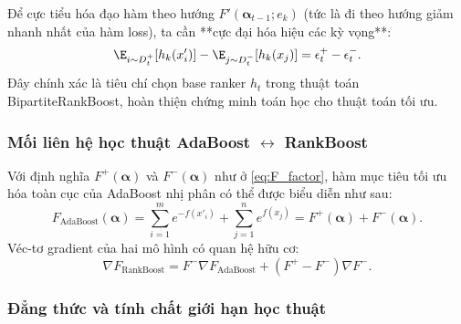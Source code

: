 \begin{extension}
Để cực tiểu hóa đạo hàm theo hướng $F'(\bm{\alpha}_{t-1}; e_k)$ (tức là đi theo hướng giảm nhanh nhất của hàm loss), ta cần **cực đại hóa hiệu các kỳ vọng**:
\[
    \E_{i \sim D^+_t}[h_k(x'_i)] - \E_{j \sim D^-_t}[h_k(x_j)] = \epsilon^+_t - \epsilon^-_t.
\]
Đây chính xác là tiêu chí chọn base ranker $h_t$ trong thuật toán BipartiteRankBoost, hoàn thiện chứng minh toán học cho thuật toán tối ưu.
\end{extension}

\subsubsection{Mối liên hệ học thuật AdaBoost $\leftrightarrow$ RankBoost}

Với định nghĩa $F^+(\bm{\alpha})$ và $F^-(\bm{\alpha})$ như ở \eqref{eq:F_factor}, hàm mục tiêu tối ưu hóa toàn cục của AdaBoost nhị phân có thể được biểu diễn như sau:
\begin{equation}
    F_{\text{AdaBoost}}(\bm{\alpha}) = \sum_{i=1}^m e^{-f(x'_i)} + \sum_{j=1}^n e^{f(x_j)} = F^+(\bm{\alpha}) + F^-(\bm{\alpha}).
\end{equation}
Véc-tơ gradient của hai mô hình có quan hệ hữu cơ:
\begin{equation}
    \nabla F_{\text{RankBoost}} = F^- \nabla F_{\text{AdaBoost}} + (F^+ - F^-)\nabla F^-.
    \label{eq:grad_relation}
\end{equation}

\subsubsection*{Đẳng thức và tính chất giới hạn học thuật}

